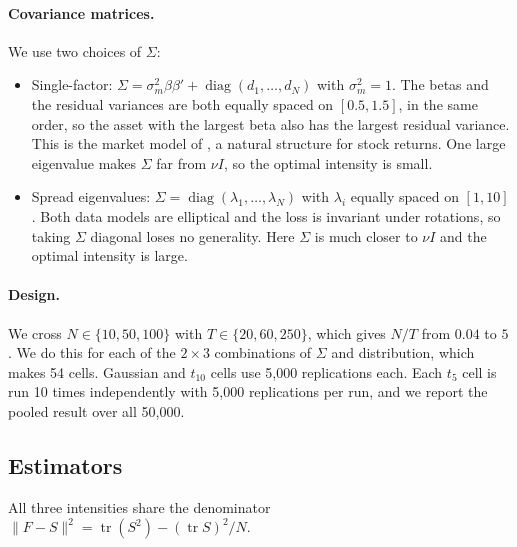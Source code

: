 \paragraph{Covariance matrices.} We use two choices of $\Sigma$:
\begin{itemize}
  \item Single-factor: $\Sigma = \sigma_m^2 \beta\beta' + \operatorname{diag}(d_1, \dots, d_N)$ with $\sigma_m^2 = 1$. The betas and the residual variances are both equally spaced on $[0.5, 1.5]$, in the same order, so the asset with the largest beta also has the largest residual variance. This is the market model of \citet{sharpe1963}, a natural structure for stock returns. One large eigenvalue makes $\Sigma$ far from $\nu I$, so the optimal intensity is small.
  \item Spread eigenvalues: $\Sigma = \operatorname{diag}(\lambda_1, \dots, \lambda_N)$ with $\lambda_i$ equally spaced on $[1, 10]$. Both data models are elliptical and the loss is invariant under rotations, so taking $\Sigma$ diagonal loses no generality. Here $\Sigma$ is much closer to $\nu I$ and the optimal intensity is large.
\end{itemize}

\paragraph{Design.} We cross $N \in \{10, 50, 100\}$ with $T \in \{20, 60, 250\}$, which gives $N/T$ from $0.04$ to $5$. We do this for each of the $2 \times 3$ combinations of $\Sigma$ and distribution, which makes 54 cells. Gaussian and $t_{10}$ cells use 5{,}000 replications each. Each $t_5$ cell is run 10 times independently with 5{,}000 replications per run, and we report the pooled result over all 50{,}000.

\subsection{Estimators}

All three intensities share the denominator $\|F - S\|^2 = \operatorname{tr}(S^2) - (\operatorname{tr}S)^2/N$.

